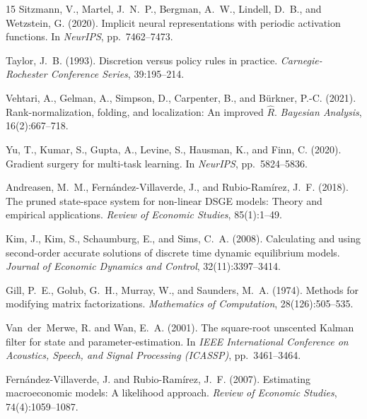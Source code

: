 \documentclass[11pt,a4paper]{article}
\theoremstyle{definition}
\begin{document}
\begin{thebibliography}{15}
		Sitzmann, V., Martel, J.~N.~P., Bergman, A.~W., Lindell, D.~B., and Wetzstein, G. (2020).
		Implicit neural representations with periodic activation functions.
		In \emph{NeurIPS}, pp.~7462--7473.
		
		Taylor, J.~B. (1993).
		Discretion versus policy rules in practice.
		\emph{Carnegie-Rochester Conference Series}, 39:195--214.
		
		Vehtari, A., Gelman, A., Simpson, D., Carpenter, B., and B{\"u}rkner, P.-C. (2021).
		Rank-normalization, folding, and localization: An improved $\hat{R}$.
		\emph{Bayesian Analysis}, 16(2):667--718.
		
		Yu, T., Kumar, S., Gupta, A., Levine, S., Hausman, K., and Finn, C. (2020).
		Gradient surgery for multi-task learning.
		In \emph{NeurIPS}, pp.~5824--5836.
		
		Andreasen, M.~M., Fern\'{a}ndez-Villaverde, J., and Rubio-Ram\'{i}rez, J.~F. (2018).
		The pruned state-space system for non-linear DSGE models: Theory and empirical applications.
		\emph{Review of Economic Studies}, 85(1):1--49.
		
		Kim, J., Kim, S., Schaumburg, E., and Sims, C.~A. (2008).
		Calculating and using second-order accurate solutions of discrete time dynamic equilibrium models.
		\emph{Journal of Economic Dynamics and Control}, 32(11):3397--3414.
		
		Gill, P.~E., Golub, G.~H., Murray, W., and Saunders, M.~A. (1974).
		Methods for modifying matrix factorizations.
		\emph{Mathematics of Computation}, 28(126):505--535.
		
		Van~der~Merwe, R. and Wan, E.~A. (2001).
		The square-root unscented Kalman filter for state and parameter-estimation.
		In \emph{IEEE International Conference on Acoustics, Speech, and Signal Processing (ICASSP)}, pp.~3461--3464.
		
		Fern{\'a}ndez-Villaverde, J. and Rubio-Ram{\'i}rez, J.~F. (2007).
		Estimating macroeconomic models: A likelihood approach.
		\emph{Review of Economic Studies}, 74(4):1059--1087.


\end{thebibliography}
\end{document}
